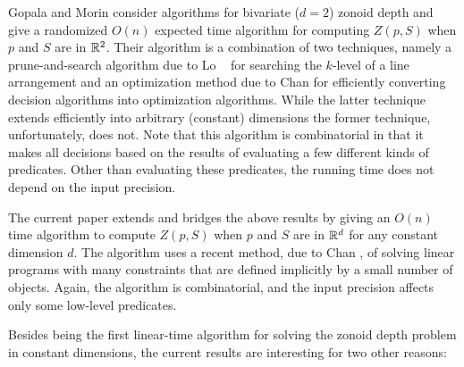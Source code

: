 \documentclass[lotsofwhite]{patmorin}
\begin{document}
Gopala and Morin \cite{gm06} consider algorithms for bivariate ($d=2$)
zonoid depth and give a randomized $O(n)$ expected time algorithm for
computing $Z(p,S)$ when $p$ and $S$ are in $\mathbb{R}^2$.  Their algorithm is
a combination of two techniques, namely a prune-and-search algorithm
due to Lo \etal\ \cite{lms94} for searching the $k$-level of a line
arrangement and an optimization method due to Chan \cite{c99} for
efficiently converting decision algorithms into optimization
algorithms.   While the latter technique extends efficiently into
arbitrary (constant) dimensions \cite{c04} the former technique,
unfortunately, does not.  Note that this algorithm is combinatorial in
that it makes all decisions based on the results of evaluating a few
different kinds of predicates. Other than evaluating these predicates,
the running time does not depend on the input precision.

The current paper extends and bridges the above results by giving an
$O(n)$ time algorithm to compute $Z(p,S)$ when $p$ and $S$ are in
$\mathbb{R}^d$ for any constant dimension $d$.  The algorithm uses a recent
method, due to Chan \cite{c04}, of solving linear programs with many
constraints that are defined implicitly by a small number of objects.
Again, the algorithm is combinatorial, and the input precision affects
only some low-level predicates.

Besides being the first linear-time algorithm for solving the zonoid
depth problem in constant dimensions, the current results are
interesting for two other reasons:
\end{document}
